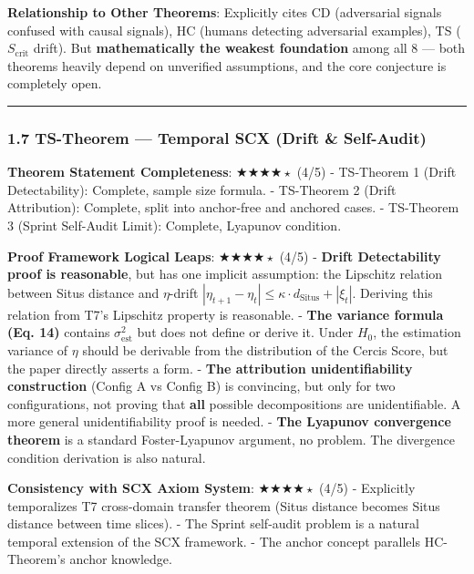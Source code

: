 \documentclass[
  12pt,
]{article}
\begin{document}
\textbf{Relationship to Other Theorems}: Explicitly cites CD (adversarial signals confused with causal signals), HC (humans detecting adversarial examples), TS ($S_{\text{crit}}$ drift). But \textbf{mathematically the weakest foundation} among all 8 --- both theorems heavily depend on unverified assumptions, and the core conjecture is completely open.

\begin{center}\rule{0.5\linewidth}{0.5pt}\end{center}

\subsubsection{1.7 TS-Theorem --- Temporal SCX (Drift \& Self-Audit)}\label{ts-theorem-temporal-scx-drift-self-audit}

\textbf{Theorem Statement Completeness}: $\bigstar\bigstar\bigstar\bigstar{\scriptstyle\star}$ (4/5)
- TS-Theorem 1 (Drift Detectability): Complete, sample size formula.
- TS-Theorem 2 (Drift Attribution): Complete, split into anchor-free and anchored cases.
- TS-Theorem 3 (Sprint Self-Audit Limit): Complete, Lyapunov condition.

\textbf{Proof Framework Logical Leaps}: $\bigstar\bigstar\bigstar\bigstar{\scriptstyle\star}$ (4/5)
- \textbf{Drift Detectability proof is reasonable}, but has one implicit assumption: the Lipschitz relation between Situs distance and $\eta$-drift $|\eta_{t+1} - \eta_t| \leq \kappa\cdot d_{\text{Situs}} + |\xi_t|$. Deriving this relation from T7's Lipschitz property is reasonable.
- \textbf{The variance formula (Eq. 14)} contains $\sigma^2_{\text{est}}$ but does not define or derive it. Under $H_0$, the estimation variance of $\eta$ should be derivable from the distribution of the Cercis Score, but the paper directly asserts a form.
- \textbf{The attribution unidentifiability construction} (Config A vs Config B) is convincing, but only for two configurations, not proving that \textbf{all} possible decompositions are unidentifiable. A more general unidentifiability proof is needed.
- \textbf{The Lyapunov convergence theorem} is a standard Foster-Lyapunov argument, no problem. The divergence condition derivation is also natural.

\textbf{Consistency with SCX Axiom System}: $\bigstar\bigstar\bigstar\bigstar{\scriptstyle\star}$ (4/5)
- Explicitly temporalizes T7 cross-domain transfer theorem (Situs distance becomes Situs distance between time slices).
- The Sprint self-audit problem is a natural temporal extension of the SCX framework.
- The anchor concept parallels HC-Theorem's anchor knowledge.
\end{document}
